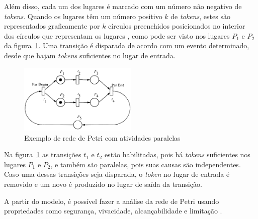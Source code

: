 Além disso, cada um dos lugares é marcado com um número não negativo de \textit{tokens}. Quando os lugares têm um número positivo $k$ de \textit{tokens}, estes são representados graficamente por $k$ círculos preenchidos posicionados no interior dos círculos que representam os lugares \cite{murata:1989}, como pode ser visto nos lugares $P_1$ e $P_2$ da figura~\ref{fig:petrinet}. Uma transição é disparada de acordo com um evento determinado, desde que hajam \textit{tokens} suficientes no lugar de entrada.

\begin{figure}[ht]
	\caption{\label{fig:petrinet}Exemplo de rede de Petri com atividades paralelas}
	\begin{center}
	    \includegraphics[width=0.5\textwidth]{resources/petri_net_murata_1}
	\end{center}
\end{figure}

Na figura~\ref{fig:petrinet} as transições $t_1$ e $t_2$ estão habilitadas, pois há \textit{tokens} suficientes nos lugares $P_1$ e $P_2$, e também são paralelas, pois suas causas são independentes. Caso uma dessas transições seja disparada, o \textit{token} no lugar de entrada é removido e um novo é produzido no lugar de saída da transição.

A partir do modelo, é possível fazer a análise da rede de Petri usando propriedades como segurança, vivacidade, alcançabilidade e limitação \cite{peterson:1981}.

